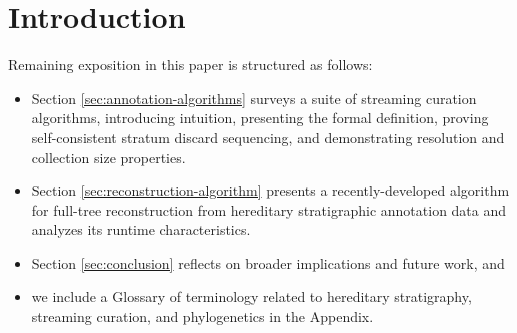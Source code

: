 \section{Introduction} \label{sec:introduction}







Remaining exposition in this paper is structured as follows:
\begin{itemize}
\item Section \ref{sec:annotation-algorithms} surveys a suite of streaming curation algorithms, introducing intuition, presenting the formal definition, proving self-consistent stratum discard sequencing, and demonstrating resolution and collection size properties.
\item Section \ref{sec:reconstruction-algorithm} presents a recently-developed algorithm for full-tree reconstruction from hereditary stratigraphic annotation data and analyzes its runtime characteristics.
\item Section \ref{sec:conclusion} reflects on broader implications and future work, and
\item we include a Glossary of terminology related to hereditary stratigraphy, streaming curation, and phylogenetics in the Appendix.
\end{itemize}
